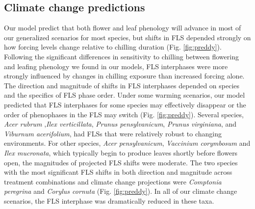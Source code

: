 \documentclass[11pt]{article}\usepackage[]{graphicx}\usepackage[]{color}
\begin{document}
\subsection*{Climate change predictions}
\noindent Our model predict that both flower and leaf phenology will advance in most of our generalized scenarios for most species, but shifts in FLS depended strongly on how forcing levels change relative to chilling duration (Fig. \ref{fig:preddy}). Following the significant differences in sensitivity to chilling between flowering and leafing phenology we found in our models, FLS interphases were more strongly influenced by changes in chilling exposure than increased forcing alone.\\

\noindent The direction and magnitude of shifts in FLS interphases depended on species and the specifics of FLS phase order. Under some warming scenarios, our model predicted that  FLS interphases for some species may effectively disappear or the order of phenophases in the FLS may switch (Fig. \ref{fig:preddy}). Several species, \textit{Acer rubrum} ,\textit{Ilex verticillata}, \textit{Prunus pensylvanicum}, \textit{Prunus virginiana}, and \textit{Viburnum acerifolium}, had FLSs that were relatively robust to changing environments. For other species, \textit{Acer pensylvanicum}, \textit{Vaccinium corymbosum} and \textit{Ilex mucronata}, which typically begin to produce leaves shortly before flowers open, the magnitudes of projected FLS shifts were moderate. The two species with the most significant FLS shifts in both direction and magnitude across treatment combinations and climate change projections were \textit{Comptonia peregrina} and \textit{Corylus cornuta} (Fig. \ref{fig:preddy}). In all of our climate change scenarios, the FLS interphase was dramatically reduced in these taxa.\\
\end{document}
